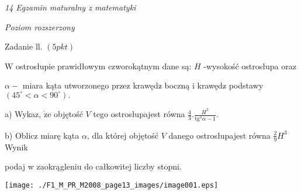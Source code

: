 \documentclass[a4paper,12pt]{article}
\begin{document}
{\it 14 Egzamin maturalny z matematyki}

{\it Poziom rozszerzony}

Zadanie ll. $(5pkt)$

$\mathrm{W}$ ostrosłupie prawidłowym czworokątnym dane są: $H$ -wysokość ostrosłupa oraz

$\alpha-$ miara kąta utworzonego przez krawędz$\acute{}$ boczną i krawędz$\acute{}$ podstawy $(45^{\circ}<\alpha<90^{\circ}).$

a) Wykaz, $\dot{\mathrm{z}}\mathrm{e}$ objętość $V$ tego ostrosłupajest równa $\displaystyle \frac{4}{3}.\frac{H^{3}}{\mathrm{t}\mathrm{g}^{2}\alpha-1}.$

b) Oblicz miarę kąta $\alpha$, dla której objętość $V$ danego ostrosłupajest równa $\displaystyle \frac{2}{9}H^{3}$ Wynik

podaj w zaokrągleniu do całkowitej liczby stopni.
\begin{center}
\texttt{[image: ./F1\_M\_PR\_M2008\_page13\_images/image001.eps]}
\end{center}
\end{document}
